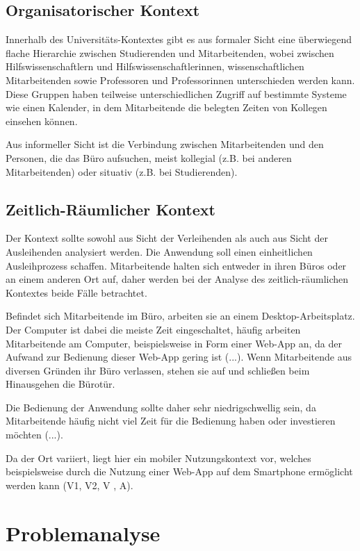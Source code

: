 \subsection*{Organisatorischer Kontext}
Innerhalb des Universitäts-Kontextes gibt es aus formaler Sicht eine überwiegend flache Hierarchie
zwischen Studierenden und Mitarbeitenden, wobei zwischen Hilfswissenschaftlern und
Hilfswissenschaftlerinnen, wissenschaftlichen Mitarbeitenden sowie Professoren und Professorinnen
unterschieden werden kann. Diese Gruppen haben teilweise unterschiedlichen Zugriff auf bestimmte
Systeme wie einen Kalender, in dem Mitarbeitende die belegten Zeiten von Kollegen einsehen können.

Aus informeller Sicht ist die Verbindung zwischen Mitarbeitenden und den Personen, die das Büro
aufsuchen, meist kollegial (z.B. bei anderen Mitarbeitenden) oder situativ (z.B. bei Studierenden).

\subsection*{Zeitlich-Räumlicher Kontext}
\label{section:zeit}
Der Kontext sollte sowohl aus Sicht der Verleihenden als auch aus Sicht der Ausleihenden analysiert
werden. Die Anwendung soll einen einheitlichen Ausleihprozess schaffen. Mitarbeitende halten sich
entweder in ihren Büros oder an einem anderen Ort auf, daher werden bei der Analyse des
zeitlich-räumlichen Kontextes beide Fälle betrachtet.

Befindet sich Mitarbeitende im Büro, arbeiten sie an einem Desktop-Arbeitsplatz. Der Computer ist
dabei die meiste Zeit eingeschaltet, häufig arbeiten Mitarbeitende am Computer, beispielsweise in
Form einer Web-App an, da der Aufwand zur Bedienung dieser Web-App gering ist (...). Wenn
Mitarbeitende aus diversen Gründen ihr Büro verlassen, stehen sie auf und schließen beim Hinausgehen
die Bürotür.

Die Bedienung der Anwendung sollte daher sehr niedrigschwellig sein, da Mitarbeitende häufig nicht
viel Zeit für die Bedienung haben oder investieren möchten (...).

Da der Ort variiert, liegt hier ein mobiler Nutzungskontext vor, welches beispielsweise durch die
Nutzung einer Web-App auf dem Smartphone ermöglicht werden kann (V1, V2, V , A).


\section{Problemanalyse}
\label{section:iststand}

